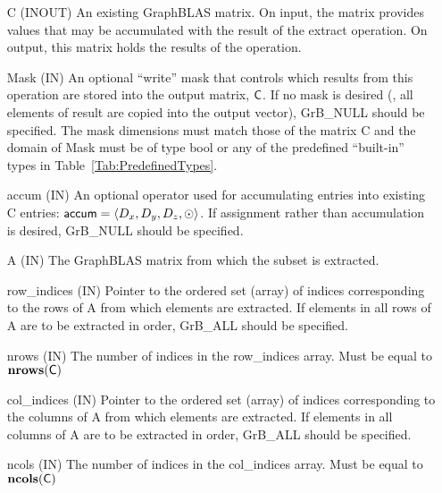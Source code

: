 \begin{itemize}[leftmargin=1in]
    \item[{\sf C}]     ({\sf INOUT}) An existing GraphBLAS matrix.  On input,
    the matrix provides values that may be accumulated with the result of the
    extract operation.  On output, this matrix holds the results of the
    operation.

    \item[{\sf Mask}]  ({\sf IN}) An optional ``write'' mask that controls which
    results from this operation are stored into the output matrix,
    ${\sf C}$.  If no mask is desired (\ie, all elements
    of result are copied into the output vector), {\sf GrB\_NULL}
    should be specified.  The mask dimensions must match those of the
    matrix {\sf C} and the domain of {\sf Mask} must be
    of type {\sf bool} or any of the predefined ``built-in'' types in
    Table~\ref{Tab:PredefinedTypes}.

    \item[{\sf accum}] ({\sf IN})  An optional operator used for accumulating
    entries into existing {\sf C} entries: ${\sf accum} = \langle D_x,
    D_y, D_z,\odot \rangle$. If assignment rather than accumulation is
    desired, {\sf GrB\_NULL} should be specified.

    \item[{\sf A}]     ({\sf IN})  The GraphBLAS matrix from which the subset
    is extracted.

    \item[{\sf row\_indices}] ({\sf IN}) Pointer to the ordered set (array) of 
    indices corresponding to the rows of {\sf A} from which elements are 
    extracted.  If elements in all rows of {\sf A} are to be extracted in order, 
    {\sf GrB\_ALL} should be specified.
    
    \item[{\sf nrows}] ({\sf IN}) The number of indices in the {\sf row\_indices}
    array.  Must be equal to $\bold{nrows}({\sf C})$
    
    \item[{\sf col\_indices}] ({\sf IN}) Pointer to the ordered set (array) of 
    indices corresponding to the columns of {\sf A} from which elements are 
    extracted.  If elements in all columns of {\sf A} are to be extracted in order, 
    {\sf GrB\_ALL} should be specified.
    
    \item[{\sf ncols}] ({\sf IN}) The number of indices in the {\sf col\_indices}
    array.  Must be equal to $\bold{ncols}({\sf C})$


\end{itemize}
